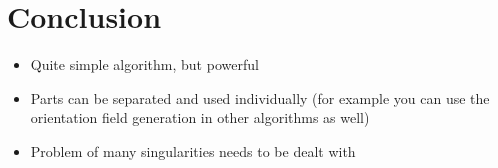 \documentclass{ACGSeminar}
\begin{document}
\section{Conclusion}
\begin{itemize}
	\item	Quite simple algorithm, but powerful
	\item	Parts can be separated and used individually (for example you can use the orientation field generation in other algorithms as well)
	\item	Problem of many singularities needs to be dealt with
\end{itemize}

\label{cha:references}
\printbibliography
\end{document}
